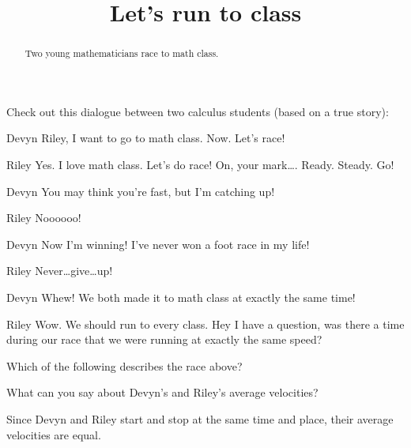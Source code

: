 \documentclass{ximera}
\title[Break-Ground:]{Let's run to class}
\begin{document}
\begin{abstract}
Two young mathematicians race to math class.
\end{abstract}
\maketitle

Check out this dialogue between two calculus students (based on a true
story):

\begin{dialogue}
\item[Devyn] Riley, I want to go to math class. Now. Let's race!
\item[Riley] Yes. I love math class. Let's do race! On, your
  mark\dots. Ready. Steady. Go!
\item[Devyn] You may think you're fast, but I'm catching up!
\item[Riley] Noooooo!
\item[Devyn] Now I'm winning! I've never won a foot race in my life!
\item[Riley] Never\dots give\dots up!
\item[Devyn] Whew! We both made it to math class at exactly the same
  time!
\item[Riley] Wow. We should run to every class. Hey I have a question,
  was there a time during our race that we were running at exactly the
  same speed?
\end{dialogue}

\begin{problem}
  Which of the following describes the race above?
  \begin{multipleChoice}
  \end{multipleChoice}
\end{problem}

\begin{problem}
  What can you say about Devyn's and Riley's average velocities?
  \begin{multipleChoice}
  \begin{feedback}
    Since Devyn and Riley start and stop at the same time and place,
    their average velocities are equal.
  \end{feedback}
  \end{multipleChoice}
\end{problem}


\end{document}
